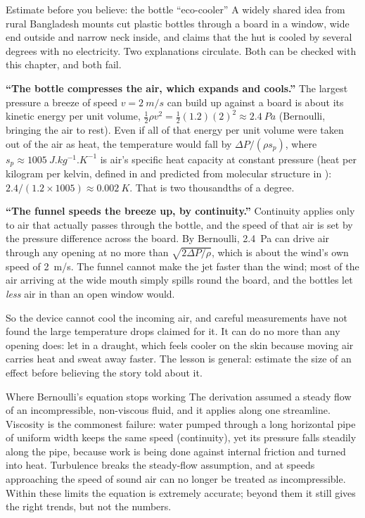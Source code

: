 \begin{remarkbox}{Estimate before you believe: the bottle ``eco-cooler''}
A widely shared idea from rural Bangladesh mounts cut plastic bottles through a board in a window, wide end
outside and narrow neck inside, and claims that the hut is cooled by several degrees with no electricity.
Two explanations circulate. Both can be checked with this chapter, and both fail.

\smallskip
\textbf{``The bottle compresses the air, which expands and cools.''} The largest pressure a breeze of speed
$v=\SI{2}{m/s}$ can build up against a board is about its kinetic energy per unit volume,
$\tfrac12\rho v^2=\tfrac12(1.2)(2)^2\approx\SI{2.4}{Pa}$ (Bernoulli, bringing the air to rest). Even if all
of that energy per unit volume were taken out of the air as heat, the temperature would fall by
$\Delta P/(\rho s_p)$, where $s_p\approx\SI{1005}{J.kg^{-1}.K^{-1}}$ is air's specific heat capacity at constant pressure (heat per kilogram per kelvin, defined in  and predicted from molecular structure in ): $2.4/(1.2\times1005)\approx\SI{0.002}{K}$. That is two thousandths of a degree.

\smallskip
\textbf{``The funnel speeds the breeze up, by continuity.''} Continuity applies only to air that actually
passes through the bottle, and the speed of that air is set by the pressure difference across the board.
By Bernoulli, \SI{2.4}{Pa} can drive air through any opening at no more than $\sqrt{2\Delta P/\rho}$, which
is about the wind's own speed of \SI{2}{m/s}. The funnel cannot make the jet faster than the wind; most
of the air arriving at the wide mouth simply spills round the board, and the bottles let \emph{less} air
in than an open window would.

\smallskip
So the device cannot cool the incoming air, and careful measurements have not found the large
temperature drops claimed for it. It can do no more than any opening does: let in a draught, which feels
cooler on the skin because moving air carries heat and sweat away faster. The lesson is general: estimate
the size of an effect before believing the story told about it.
\end{remarkbox}

\begin{remarkbox}{Where Bernoulli's equation stops working}
The derivation assumed a steady flow of an incompressible, non-viscous fluid, and it applies along one
streamline. Viscosity is the commonest failure: water pumped through a long horizontal pipe of uniform
width keeps the same speed (continuity), yet its pressure falls steadily along the pipe, because work is
being done against internal friction and turned into heat. Turbulence breaks the steady-flow assumption,
and at speeds approaching the speed of sound air can no longer be treated as incompressible. Within these
limits the equation is extremely accurate; beyond them it still gives the right trends, but not the
numbers.
\end{remarkbox}

